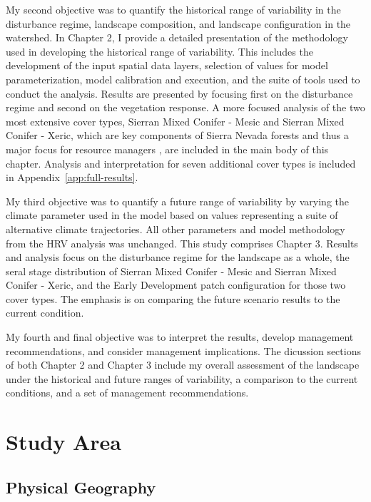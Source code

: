 My second objective was to quantify the historical range of variability in the disturbance regime, landscape composition, and landscape configuration in the watershed. In Chapter 2, I provide a detailed presentation of the methodology used in developing the historical range of variability. This includes the development of the input spatial data layers, selection of values for model parameterization, model calibration and execution, and the suite of tools used to conduct the analysis. Results are presented by focusing first on the disturbance regime and second on the vegetation response. A more focused analysis of the two most extensive cover types, Sierran Mixed Conifer - Mesic and Sierran Mixed Conifer - Xeric, which are key components of Sierra Nevada forests and thus a major focus for resource managers \citep{North2010}, are included in the main body of this chapter. Analysis and interpretation for seven additional cover types is included in Appendix~\ref{app:full-results}. 

My third objective was to quantify a future range of variability by varying the climate parameter used in the model based on values representing a suite of alternative climate trajectories. All other parameters and model methodology from the HRV analysis was unchanged. This study comprises Chapter 3. Results and analysis focus on the disturbance regime for the landscape as a whole, the seral stage distribution of Sierran Mixed Conifer - Mesic and Sierran Mixed Conifer - Xeric, and the Early Development patch configuration for those two cover types. The emphasis is on comparing the future scenario results to the current condition. 

My fourth and final objective was to interpret the results, develop management recommendations, and consider management implications. The dicussion sections of both Chapter 2 and Chapter 3 include my overall assessment of the landscape under the historical and future ranges of variability, a comparison to the current conditions, and a set of management recommendations. 


\section{Study Area}

\subsection{Physical Geography}

